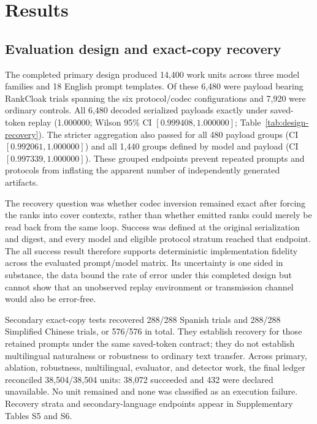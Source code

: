 \documentclass[fleqn,10pt]{wlscirep}
\begin{document}
\section*{Results}\label{sec:results}

\subsection*{Evaluation design and exact-copy recovery}\label{sec:results-recovery}

The completed primary design produced 14,400 work units across three model families and 18 English prompt templates. Of these 6,480 were payload bearing RankCloak trials spanning the six protocol/codec configurations and 7,920 were ordinary controls. All 6,480 decoded serialized payloads exactly under saved-token replay (1.000000; Wilson 95\% CI \([0.999408, 1.000000]\); Table~\ref{tab:design-recovery}). The stricter aggregation also passed for all 480 payload groups (CI \([0.992061, 1.000000]\)) and all 1,440 groups defined by model and payload (CI \([0.997339, 1.000000]\)). These grouped endpoints prevent repeated prompts and protocols from inflating the apparent number of independently generated artifacts.

The recovery question was whether codec inversion remained exact after forcing the ranks into cover contexts, rather than whether emitted ranks could merely be read back from the same loop. Success was defined at the original serialization and digest, and every model and eligible protocol stratum reached that endpoint. The all success result therefore supports deterministic implementation fidelity across the evaluated prompt/model matrix. Its uncertainty is one sided in substance, the data bound the rate of error under this completed design but cannot show that an unobserved replay environment or transmission channel would also be error-free.

Secondary exact-copy tests recovered 288/288 Spanish trials and 288/288 Simplified Chinese trials, or 576/576 in total. They establish recovery for those retained prompts under the same saved-token contract; they do not establish multilingual naturalness or robustness to ordinary text transfer. Across primary, ablation, robustness, multilingual, evaluator, and detector work, the final ledger reconciled 38,504/38,504 units: 38,072 succeeded and 432 were declared unavailable. No unit remained and none was classified as an execution failure. Recovery strata and secondary-language endpoints appear in Supplementary Tables S5 and S6.
\end{document}
